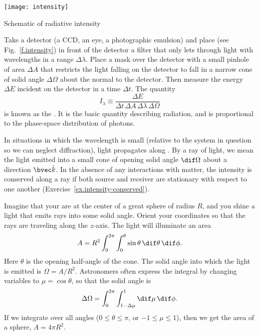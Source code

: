 \begin{marginfigure}[6\baselineskip]
\texttt{[image: intensity]}
\caption{\label{f.intensity} Schematic of radiative intensity}
\end{marginfigure}
Take a detector (a CCD, an eye, a photographic emulsion) and place (see Fig.~\ref{f.intensity}) in front of the detector a filter that only lets through light with wavelengths in a range $\Delta\lambda$. Place a mask over the detector with a small pinhole of area $\Delta A$ that restricts the light falling on the detector to fall in a narrow cone of solid angle $\Delta\Omega$ about the normal to the detector. Then measure the energy $\Delta E$ incident on the detector in a time $\Delta t$. The quantity
\begin{equation}\label{e.definition-intensity}
I_{\lambda} \equiv \frac{\Delta E}{\Delta t\,\Delta A\,\Delta\lambda\,\Delta\Omega}
\end{equation}
is known as the . It is the basic quantity describing radiation, and is proportional to the phase-space distribution of photons.

In situations in which the wavelength is small (relative to the system in question so we can neglect diffraction), light propagates along . By a ray of light, we mean the light emitted into a small cone of opening solid angle $\dif\Omega$ about a direction $\unitk$. In the absence of any interactions with matter, the intensity is conserved along a ray if both source and receiver are stationary with respect to one another (Exercise~\ref{ex.intensity-conserved}).

\begin{sidebar}
\label{sb.solid-angles}
Imagine that your are at the center of a great sphere of radius $R$, and you shine a light that emits rays into some solid angle. Orient your coordinates so that the rays are traveling along the $z$-axis. The light will illuminate an area
\[ 	A = R^{2}\int_{0}^{2\pi}\int_{0}^{\theta}\sin\theta\,\dif\theta\,\dif\phi. \]
Here $\theta$ is the opening half-angle of the cone. The solid angle into which the light is emitted is $\Omega = A/R^{2}$. Astronomers often express the integral by changing variables to $\mu = \cos\theta$, so that the solid angle is
\[
	\Delta\Omega = \int_{0}^{2\pi}\int_{1-\Delta\mu}^{1}\dif\mu\,\dif\phi.
\]
If we integrate over all angles ($0\le\theta\le\pi$, or $-1\le\mu\le 1$), then we get the area of a sphere, $A = 4\pi R^{2}$.
\end{sidebar}

